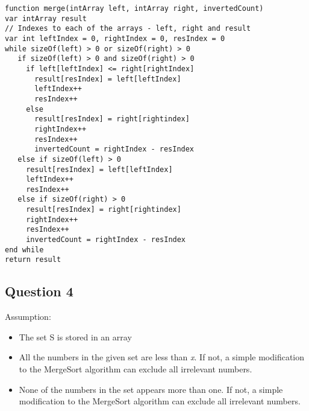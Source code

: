\documentclass{article}
\begin{document}
\vspace{0.5cm} \texttt{function merge(intArray left, intArray right,
invertedCount)}\\
\texttt{var intArray result}\\
\texttt{// Indexes to each of the arrays - left, right and result}\\
\texttt{var int leftIndex = 0, rightIndex = 0, resIndex = 0}\\
\texttt{while sizeOf(left) > 0 or sizeOf(right) > 0}\\
\texttt{$\quad$ if sizeOf(left) > 0 and sizeOf(right) > 0}\\
\texttt{$\quad\quad$ if left[leftIndex] <= right[rightIndex]}\\
\texttt{$\quad\quad\quad$ result[resIndex] = left[leftIndex]}\\
\texttt{$\quad\quad\quad$ leftIndex++}\\
\texttt{$\quad\quad\quad$ resIndex++}\\
\texttt{$\quad\quad$ else}\\
\texttt{$\quad\quad\quad$ result[resIndex] = right[rightindex]}\\
\texttt{$\quad\quad\quad$ rightIndex++}\\
\texttt{$\quad\quad\quad$ resIndex++}\\
\texttt{$\quad\quad\quad$ invertedCount = rightIndex - resIndex}\\
\texttt{$\quad$ else if sizeOf(left) > 0}\\
\texttt{$\quad\quad$ result[resIndex] = left[leftIndex]}\\
\texttt{$\quad\quad$ leftIndex++}\\
\texttt{$\quad\quad$ resIndex++}\\
\texttt{$\quad$ else if sizeOf(right) > 0}\\
\texttt{$\quad\quad$ result[resIndex] = right[rightindex]}\\
\texttt{$\quad\quad$ rightIndex++}\\
\texttt{$\quad\quad$ resIndex++}\\
\texttt{$\quad\quad$ invertedCount = rightIndex - resIndex}\\
\texttt{end while}\\
\texttt{return result}\\
\vfill

\subsection*{Question 4} Assumption:
\begin{itemize}
  \item The set S is stored in an array
  \item All the numbers in the given set are less than \textit{x}. If not, a
  simple modification to the MergeSort algorithm can exclude all irrelevant
  numbers.
  \item None of the numbers in the set appears more than one. If not, a simple
  modification to the MergeSort algorithm can exclude all irrelevant numbers.
\end{itemize}
\end{document}
